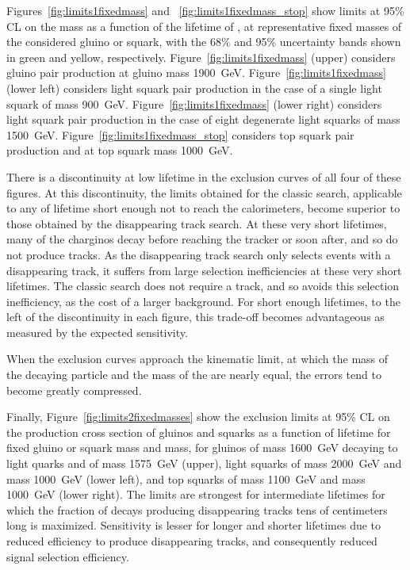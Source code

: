   Figures~\ref{fig:limits1fixedmass} and ~\ref{fig:limits1fixedmass_stop} show limits at 95\% CL on the \lsp mass as a function of the lifetime of \chargino, at representative fixed masses of the considered gluino or squark, with the 68\% and 95\% uncertainty bands shown in green and yellow, respectively.
  Figure~\ref{fig:limits1fixedmass} (upper) considers gluino pair production at gluino mass 1900~GeV.
  Figure~\ref{fig:limits1fixedmass} (lower left) considers light squark pair production in the case of a single light squark of mass 900~GeV.
  Figure~\ref{fig:limits1fixedmass} (lower right) considers light squark pair production in the case of eight degenerate light squarks of mass 1500~GeV.
  Figure~\ref{fig:limits1fixedmass_stop} considers top squark pair production and at top squark mass 1000~GeV.

  There is a discontinuity at low \chargino lifetime in the exclusion curves of all four of these figures.
  At this discontinuity, the limits obtained for the classic search, applicable to any \chargino of lifetime short enough not to reach the calorimeters, become superior to those obtained by the disappearing track search.
  At these very short lifetimes, many of the charginos decay before reaching the tracker or soon after, and so do not produce tracks.
  As the disappearing track search only selects events with a disappearing track, it suffers from large selection inefficiencies at these very short lifetimes.
  The classic search does not require a track, and so avoids this selection inefficiency, as the cost of a larger background.
  For short enough \chargino lifetimes, to the left of the discontinuity in each figure, this trade-off becomes advantageous as measured by the expected sensitivity.

  When the exclusion curves approach the kinematic limit, at which the mass of the decaying particle and the mass of the \chargino are nearly equal, the errors tend to become greatly compressed.

  Finally, Figure~\ref{fig:limits2fixedmasses} show the exclusion limits at 95\% CL on the production cross section of gluinos and squarks as a function of \chargino lifetime for fixed gluino or squark mass and \lsp mass, for gluinos of mass 1600~GeV decaying to light quarks and \lsp of mass 1575~GeV (upper), light squarks of mass 2000~GeV and \lsp mass 1000~GeV (lower left), and top squarks of mass 1100~GeV and \lsp mass 1000~GeV (lower right).
  The limits are strongest for intermediate \chargino lifetimes for which the fraction of \chargino decays producing disappearing tracks tens of centimeters long is maximized.
  Sensitivity is lesser for longer and shorter lifetimes due to reduced efficiency to produce disappearing tracks, and consequently reduced signal selection efficiency.

